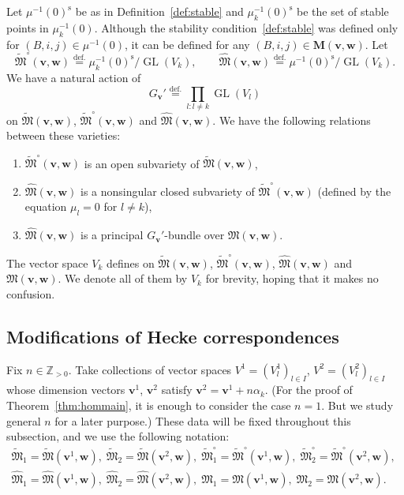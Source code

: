 \documentclass[12pt]{amsart}
\def\Bbb{\mathbb}
\def\frak{\mathfrak}
\renewcommand{\labelenumi}{(\theenumi)}%
\newenvironment{aenume}{%
  \begin{enumerate}%
  \renewcommand{\theenumi}{\alph{enumi}}%
  \renewcommand{\labelenumi}{(\theenumi)}%
  }{\end{enumerate}}
\theoremstyle{definition}
\theoremstyle{remark}
\numberwithin{equation}{subsection}
\newcommand{\thmref}[1]{Theorem~\ref{#1}}
\newcommand{\defref}[1]{Definition~\ref{#1}}
\newcommand{\defeq}{\overset{\operatorname{\scriptstyle def.}}{=}}
\newcommand{\Z}{{\Bbb Z}}
\newcommand{\GL}{\operatorname{GL}}
\newcommand{\bM}{{\mathbf M}} %
\newcommand{\M}{{\frak M}} %
\newcommand{\bv}{{\mathbf v}} %
\newcommand{\bw}{{\mathbf w}} %
\newcommand{\Mp}{\widetilde\M}
\newcommand{\Mpp}{\widehat\M}
\begin{document}
Let $\mu^{-1}(0)^{\operatorname{s}}$ be as in \defref{def:stable} and
$\mu_k^{-1}(0)^{\operatorname{s}}$ be the set of stable points in
$\mu_k^{-1}(0)$. Although the stability condition~\eqref{def:stable}
was defined only for $(B,i,j)\in\mu^{-1}(0)$, it can be defined
for any $(B,i,j)\in\bM(\bv,\bw)$.
Let
\begin{equation*}
  \Mp^{\circ}(\bv,\bw) \defeq \mu_k^{-1}(0)^{\operatorname{s}}/\GL(V_k),
   \qquad
  \Mpp(\bv,\bw) \defeq \mu^{-1}(0)^{\operatorname{s}}/\GL(V_k).
\end{equation*}
We have a natural action of 
\[
G_\bv' \defeq \prod_{l:l \neq k} \GL(V_l)
\]
on $\Mp(\bv,\bw)$, $\Mp^\circ(\bv,\bw)$ and $\Mpp(\bv,\bw)$.
We have the following relations between these varieties:
\begin{aenume}
\item $\Mp^{\circ}(\bv,\bw)$ is an open subvariety
of $\Mp(\bv,\bw)$,
\item $\Mpp(\bv,\bw)$ is a nonsingular closed subvariety of
$\Mp^\circ(\bv,\bw)$ (defined by the equation
$\mu_l = 0$ for $l\neq k$),
\item  $\Mpp(\bv,\bw)$ is a principal 
$G_\bv'$-bundle over $\M(\bv,\bw)$.
\end{aenume}

The vector space $V_k$ defines 
on $\Mp(\bv,\bw)$, $\Mp^\circ(\bv,\bw)$, $\Mpp(\bv,\bw)$ and
$\M(\bv,\bw)$. We denote all of them by $V_k$ for brevity, hoping that
it makes no confusion.

\subsection{Modifications of Hecke correspondences}\label{subsec:modHecke}
Fix $n \in \Z_{> 0}$.
Take collections of vector spaces $V^1 = (V^1_l)_{l\in I}$, $V^2 =
(V^2_l)_{l\in I}$ whose dimension vectors $\bv^1$, $\bv^2$ satisfy
$\bv^2 = \bv^1 + n\alpha_k$. 
(For the proof of \thmref{thm:hommain}, it is enough to consider the case
$n = 1$. But we study general $n$ for a later purpose.)
These data will be fixed throughout this
subsection, and we use the following notation:
\begin{gather*}
\Mp_1 = \Mp(\bv^1,\bw),\; \Mp_2 = \Mp(\bv^2,\bw),\;
  \Mp_1^\circ = \Mp^\circ(\bv^1,\bw),\;
  \Mp_2^\circ = \Mp^\circ(\bv^2,\bw),\; \\
  \Mpp_1 = \Mpp(\bv^1,\bw),\; \Mpp_2 = \Mpp(\bv^2,\bw),\;
  \M_1 = \M(\bv^1,\bw), \; \M_2 = \M(\bv^2,\bw).
\end{gather*}
\end{document}
